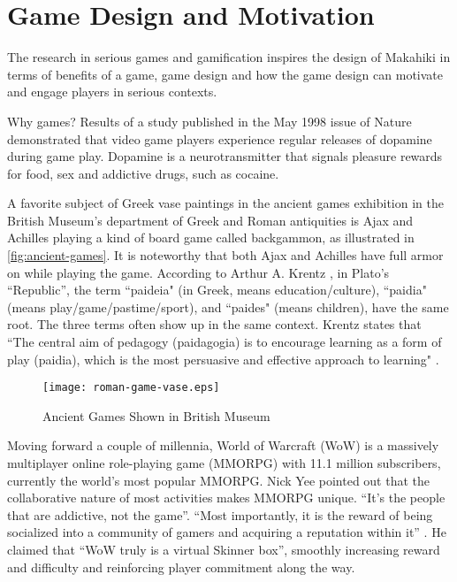 \section{Game Design and Motivation}
\label{sec:game-design}

The research in serious games and gamification inspires the design of Makahiki in terms of benefits of a game, game design and how the game design can motivate and engage players in serious contexts. 

Why games? Results of a study published in the May 1998 issue of Nature \cite {koepp1998evidence} demonstrated that video game players experience regular releases of dopamine during game play. Dopamine is a neurotransmitter that signals pleasure rewards for food, sex and addictive drugs, such as cocaine. 

A favorite subject of Greek vase paintings in the ancient games exhibition in the British Museum's department of Greek and Roman antiquities is Ajax and Achilles playing a kind of board game called backgammon, as illustrated in \autoref{fig:ancient-games}. It is noteworthy that both Ajax and Achilles have full armor on while playing the game. According to Arthur A. Krentz \cite{krentz1998play}, in Plato's ``Republic'', the term ``paideia" (in Greek, means education/culture), ``paidia" (means play/game/pastime/sport), and ``paides" (means children), have the same root. The three terms often show up in the same context. Krentz states that ``The central aim of pedagogy (paidagogia) is to encourage learning as a form of play (paidia), which is the most persuasive and effective approach to learning" .

\begin{figure}[ht!]
	\centering
		\texttt{[image: roman-game-vase.eps]}
		\caption{Ancient Games Shown in British Museum}
		\label{fig:ancient-games}
\end{figure}

Moving forward a couple of millennia, World of Warcraft (WoW) is a massively multiplayer online role-playing game (MMORPG) with 11.1 million subscribers, currently the world's most popular MMORPG.  Nick Yee \cite {yee2002understanding} pointed out that the collaborative nature of most activities makes MMORPG unique. ``It's the people that are addictive, not the game''. ``Most importantly, it is the reward of being socialized into a community of gamers and acquiring a reputation within it''  . He claimed \cite {yee2001vsb} that ``WoW truly is a virtual Skinner box'', smoothly increasing reward and difficulty and reinforcing player commitment along the way.
	
